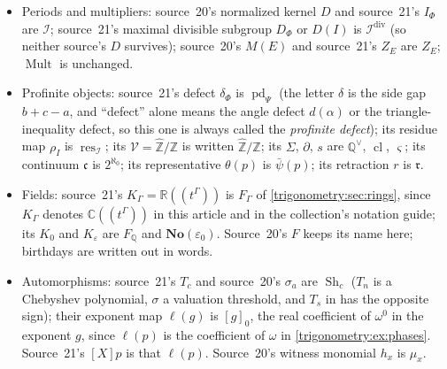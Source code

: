 \documentclass[11pt,letterpaper]{article}
\numberwithin{equation}{section}
\theoremstyle{definition}
\theoremstyle{remark}
\newcommand{\No}{\mathbf{No}}
\newcommand{\R}{\mathbb R}
\newcommand{\C}{\mathbb C}
\newcommand{\Q}{\mathbb Q}
\newcommand{\Z}{\mathbb Z}
\newcommand{\eps}{\varepsilon}
\newcommand{\Mult}{\operatorname{Mult}}
\newcommand{\res}{\operatorname{res}}
\newcommand{\pd}{\operatorname{pd}}
\newcommand{\Sh}{\operatorname{Sh}}
\newcommand{\cl}{\operatorname{cl}}
\newcommand{\Zhat}{\widehat{\Z}}
\newcommand{\Qv}{\Q^{\vee}}
\newcommand{\cI}{\mathcal I}
\begin{document}
\begin{itemize}
 source~20 and for $r\mapsto e^{2\pi ir}$ in source~21; the printed symbols differ, and neither is
 used here.) The strip exponential of
 \cref{trigonometry:thm:stripexp} keeps the letter $E$ without subscript.
\item Periods and multipliers: source~20's normalized kernel $D$ and source~21's $I_\Phi$ are $\cI$;
 source~21's maximal divisible subgroup $D_\Phi$ or $D(I)$ is $\cI^{\mathrm{div}}$ (so neither source's
 $D$ survives); source~20's $M(E)$ and source~21's $Z_E$ are $Z_E$; $\Mult$ is unchanged.
\item Profinite objects: source~21's defect $\delta_\Phi$ is $\pd_\Psi$ (the letter $\delta$ is the side gap
 $b+c-a$, and ``defect'' alone means the angle defect $d(\alpha)$ or the triangle-inequality defect,
 so this one is always called the \emph{profinite defect}); its residue map $\rho_I$ is $\res_{\cI}$;
 its $\mathcal V=\Zhat/\Z$ is written $\Zhat/\Z$; its $\Sigma$, $\partial$, $s$ are $\Qv$, $\cl$,
 $\varsigma$; its continuum $\mathfrak c$ is $2^{\aleph_0}$; its representative $\theta(p)$ is
 $\bar\psi(p)$; its retraction $r$ is $\mathfrak r$.
\item Fields: source~21's $K_\Gamma=\R((t^\Gamma))$ is $F_\Gamma$ of \cref{trigonometry:sec:rings}, since
 $K_\Gamma$ denotes $\C((t^\Gamma))$ in this article and in the collection's notation guide; its $K_0$ and
 $K_\eps$ are $F_{\Q}$ and $\No(\eps_0)$. Source~20's $F$ keeps its name here; birthdays are written
 out in words.
\item Automorphisms: source~21's $T_c$ and source~20's $\sigma_a$ are $\Sh_c$ ($T_n$ is a Chebyshev
 polynomial, $\sigma$ a valuation threshold, and $T_s$ in \cite{Saut} has the opposite sign); their
 exponent map $\ell(g)$ is $[g]_0$, the real coefficient of $\omega^0$ in the exponent $g$, since
 $\ell(p)$ is the coefficient of $\omega$ in \cref{trigonometry:ex:phases}. Source~21's $[X]p$ is that
 $\ell(p)$. Source~20's witness monomial $h_x$ is $\mu_x$.
\end{itemize}
\end{document}
